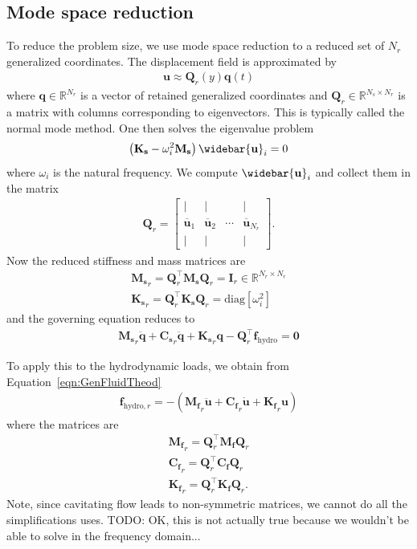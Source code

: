\documentclass[10pt]{article}
\newcommand{\mbf}[1]{\mathbf{#1}}
\newcommand{\be}{\begin{eqnarray}}
\newcommand{\ee}{\end{eqnarray}}
\newcommand{\tn}[1]{\textrm{#1}}
\begin{document}
% 
\subsection{Mode space reduction}
%
To reduce the problem size, we use mode space reduction to a reduced set of $N_r$ generalized coordinates.
The displacement field is approximated by
%
\be
\mbf{u} \approx \mbf{Q}_r(y) \mbf{q}(t)
\ee
%
where $\mbf{q} \in \mathbb{R}^{N_r}$ is a vector of retained generalized coordinates and $\mbf{Q}_r \in \mathbb{R}^{N_s \times N_r}$ is a matrix with columns corresponding to eigenvectors.
This is typically called the normal mode method.
One then solves the eigenvalue problem
%
\be
\left( \mbf{K_s} - \omega_i^2 \mbf{M_s}
\right)
\widebar{  \mbf{u} }_i = 0
\ee
%
where $\omega_i$ is the natural frequency.
We compute $\widebar{  \mbf{u} }_i$ and collect them in the matrix
%
\be
\mbf{Q}_r=\left[\begin{array}{cccc}
		\mid                 & \mid                 &        & \mid                     \\
		\overline{\mbf{u}}_1 & \overline{\mbf{u}}_2 & \cdots & \overline{\mbf{u}}_{N_r} \\
		\mid                 & \mid                 &        & \mid
	\end{array}\right]
.
\ee
%
Now the reduced stiffness and mass matrices are
%
\be
\mbf{M_s}_r = \mbf{Q}_r^{\top} \mbf{M_s} \mbf{Q}_r = \mbf{I}_r \in \mathbb{R}^{N_r \times N_r} \\
\mbf{K_s}_r = \mbf{Q}_r^{\top} \mbf{K_s} \mbf{Q}_r = \tn{diag}\left[ \omega_i^2   \right]
\ee
%
and the governing equation reduces to
%
\be
\mbf{M_s}_r \ddot{\mbf{q}} + \mbf{C_s}_r \ddot{\mbf{q}} + \mbf{K_s}_r \mbf{q} - \mbf{Q}_r^{\top} \mbf{f}_{\tn{hydro}} = \mbf{0}
\ee
%

To apply this to the hydrodynamic loads, we obtain from Equation~\eqref{eqn:GenFluidTheod}
%
\be
\mbf{f}_{\tn{hydro},r} =
-\left( \mbf{M_f}_r \ddot{\mbf{u}} + \mbf{C_f}_r \dot{\mbf{u}} + \mbf{K_f}_r \mbf{u}\right)
\ee
%
where the matrices are
%
\be
\mbf{M_f}_r = \mbf{Q}_r^{\top} \mbf{M_f} \mbf{Q}_r \\
\mbf{C_f}_r = \mbf{Q}_r^{\top} \mbf{C_f} \mbf{Q}_r \\
\mbf{K_f}_r = \mbf{Q}_r^{\top} \mbf{K_f} \mbf{Q}_r.
\ee
Note, since cavitating flow leads to non-symmetric matrices, we cannot do all the simplifications \citet{Jonsson2017a} uses.
TODO: OK, this is not actually true because we wouldn't be able to solve in the frequency domain...
\end{document}
